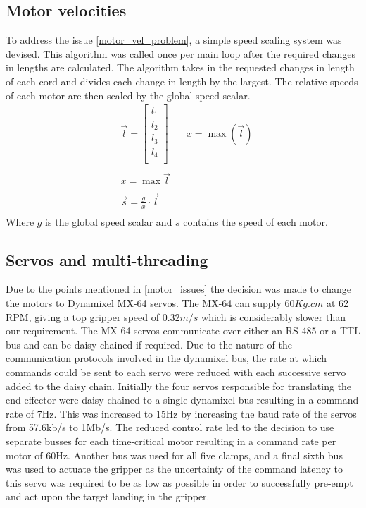 \documentclass[conference]{IEEEtran}
\begin{document}
\subsection{Motor velocities}\label{motor_speed_section}
To address the issue \ref{motor_vel_problem}, a simple speed scaling system was devised. This algorithm was called once per main loop after the required changes in lengths are calculated. The algorithm takes in the requested changes in length of each cord and divides each change in length by the largest. The relative speeds of each motor are then scaled by the global speed scalar.
\begin{equation}\label{motor_speed_equation}
\begin{aligned}
&\vec{l} = \begin{bmatrix}
l_1\\l_2\\l_3\\l_4\\
\end{bmatrix}\quad
&x = \max\left(\vec{l}\right)\\\\
&x = \max\vec{l}\\\\
&\vec{s} = \frac{g}{x}\cdot \vec{l}\\
\end{aligned}
\end{equation}
Where $g$ is the global speed scalar and $s$ contains the speed of each motor. 
\subsection{Servos and multi-threading}
Due to the points mentioned in \ref{motor_issues} the decision was made to change the motors to Dynamixel MX-64 servos. The MX-64 can supply $60Kg.cm$ at 62 RPM, giving a top gripper speed of $0.32m/s$ which is considerably slower than our requirement. The MX-64 servos communicate over either an RS-485 or a TTL bus and can be daisy-chained if required. Due to the nature of the communication protocols involved in the dynamixel bus, the rate at which commands could be sent to each servo were reduced with each successive servo added to the daisy chain. Initially the four servos responsible for translating the end-effector were daisy-chained to a single dynamixel bus resulting in a command rate of 7Hz. This was increased to 15Hz by increasing the baud rate of the servos from 57.6kb/s to 1Mb/s. The reduced control rate led to the decision to use separate busses for each time-critical motor resulting in a command rate per motor of 60Hz. Another bus was used for all five clamps, and a final sixth bus was used to actuate the gripper as the uncertainty of the command latency to this servo was required to be as low as possible in order to successfully pre-empt and act upon the target landing in the gripper. 
\end{document}
